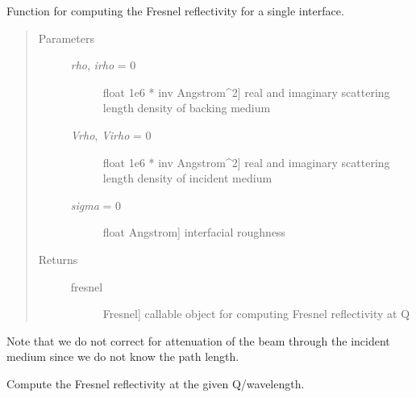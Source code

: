 \documentclass[letterpaper,10pt,english]{sphinxmanual}
\begin{document}
\begin{fulllineitems}
\label{api/fresnel:refl1d.fresnel.Fresnel}
Function for computing the Fresnel reflectivity for a single interface.
\begin{quote}\begin{description}
\item[{Parameters }] \leavevmode\begin{description}
\item[{\emph{rho}, \emph{irho} = 0}] \leavevmode{[}float \textbar{} 1e6 * inv Angstrom\textasciicircum{}2{]}
real and imaginary scattering length density of backing medium

\item[{\emph{Vrho}, \emph{Virho} = 0}] \leavevmode{[}float \textbar{} 1e6 * inv Angstrom\textasciicircum{}2{]}
real and imaginary scattering length density of incident medium

\item[{\emph{sigma} = 0}] \leavevmode{[}float \textbar{} Angstrom{]}
interfacial roughness

\end{description}

\item[{Returns }] \leavevmode\begin{description}
\item[{fresnel}] \leavevmode{[}Fresnel{]}
callable object for computing Fresnel reflectivity at Q

\end{description}

\end{description}\end{quote}

Note that we do not correct for attenuation of the beam through the
incident medium since we do not know the path length.

\begin{fulllineitems}
\label{api/fresnel:refl1d.fresnel.Fresnel.reflectivity}
Compute the Fresnel reflectivity at the given Q/wavelength.

\end{fulllineitems}


\end{fulllineitems}
\end{document}
